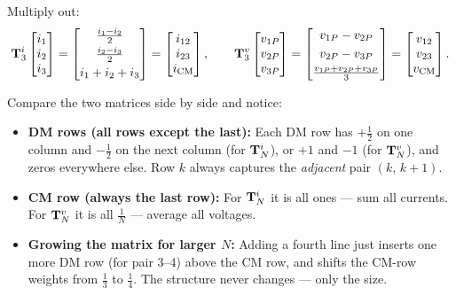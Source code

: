 Multiply out:
\[
\mathbf{T}^{i}_{3}
\begin{bmatrix} i_1 \\ i_2 \\ i_3 \end{bmatrix}
=
\begin{bmatrix}
\tfrac{i_1 - i_2}{2} \\[3pt]
\tfrac{i_2 - i_3}{2} \\[3pt]
i_1 + i_2 + i_3
\end{bmatrix}
=
\begin{bmatrix} i_{12} \\ i_{23} \\ i_{\mathrm{CM}} \end{bmatrix},
\qquad
\mathbf{T}^{v}_{3}
\begin{bmatrix} v_{1P} \\ v_{2P} \\ v_{3P} \end{bmatrix}
=
\begin{bmatrix}
v_{1P} - v_{2P} \\[3pt]
v_{2P} - v_{3P} \\[3pt]
\tfrac{v_{1P}+v_{2P}+v_{3P}}{3}
\end{bmatrix}
=
\begin{bmatrix} v_{12} \\ v_{23} \\ v_{\mathrm{CM}} \end{bmatrix}.
\]

\begin{physbox}[Spotting the Pattern Across $N = 2$ and $N = 3$]
Compare the two matrices side by side and notice:
\begin{itemize}
    \item \textbf{DM rows (all rows except the last):} Each DM row
          has $+\tfrac{1}{2}$ on one column and $-\tfrac{1}{2}$ on
          the next column (for $\mathbf{T}^{i}_{N}$), or $+1$ and $-1$
          (for $\mathbf{T}^{v}_{N}$), and zeros everywhere else.  Row $k$ always
          captures the \emph{adjacent} pair $(k,\, k+1)$.

    \item \textbf{CM row (always the last row):} For $\mathbf{T}^{i}_{N}$ it is
          all ones — sum all currents.  For $\mathbf{T}^{v}_{N}$ it is all
          $\tfrac{1}{N}$ — average all voltages.

    \item \textbf{Growing the matrix for larger $N$:} Adding a
          fourth line just inserts one more DM row (for pair 3--4)
          above the CM row, and shifts the CM-row weights from
          $\tfrac{1}{3}$ to $\tfrac{1}{4}$.  The structure never
          changes — only the size.
\end{itemize}
\end{physbox}

